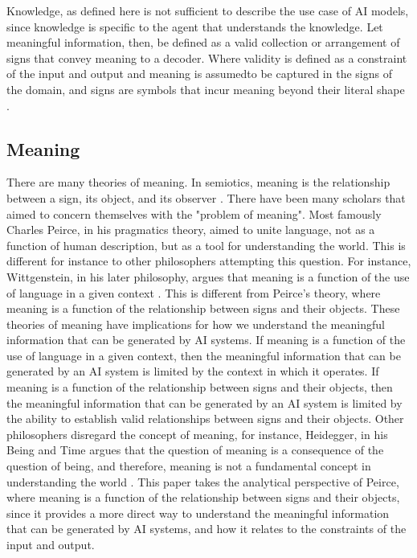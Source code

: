\documentclass[stu,12pt]{apa7}
\theoremstyle{definition}
\begin{document}
Knowledge, as defined here is not sufficient to describe the use case of AI models, since knowledge is specific to the agent that understands the knowledge. Let meaningful information, then, be defined as a valid collection or arrangement of signs that convey meaning to a decoder. Where validity is defined as a constraint of the input and output and meaning is assumed\footnotemark to be captured in the signs of the domain, and signs are symbols that incur meaning beyond their literal shape \parencite{thornbury2011peirce}.

\subsection{Meaning}
There are many theories of meaning. In semiotics, meaning is the relationship between a sign, its object, and its observer \parencite{thornbury2011peirce}. There have been many scholars that aimed to concern themselves with the "problem of meaning". Most famously Charles Peirce, in his pragmatics theory, aimed to unite language, not as a function of human description, but as a tool for understanding the world. This is different for instance to other philosophers attempting this question. For instance, Wittgenstein, in his later philosophy, argues that meaning is a function of the use of language in a given context \parencite{speaks2010theories}. This is different from Peirce's theory, where meaning is a function of the relationship between signs and their objects. These theories of meaning have implications for how we understand the meaningful information that can be generated by AI systems. If meaning is a function of the use of language in a given context, then the meaningful information that can be generated by an AI system is limited by the context in which it operates. If meaning is a function of the relationship between signs and their objects, then the meaningful information that can be generated by an AI system is limited by the ability to establish valid relationships between signs and their objects. Other philosophers disregard the concept of meaning, for instance, Heidegger, in his Being and Time argues that the question of meaning is a consequence of the question of being, and therefore, meaning is not a fundamental concept in understanding the world \parencite{macquarrie1973being}. This paper takes the analytical perspective of Peirce, where meaning is a function of the relationship between signs and their objects, since it provides a more direct way to understand the meaningful information that can be generated by AI systems, and how it relates to the constraints of the input and output. 
\end{document}
